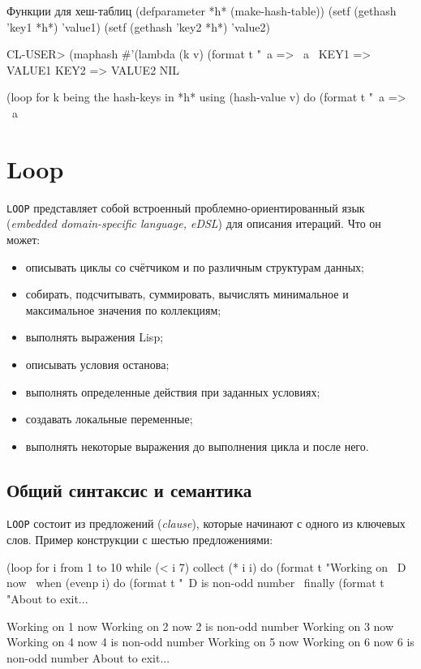 \begin{cllst}{Функции для хеш-таблиц}{}
(defparameter *h* (make-hash-table))
(setf (gethash 'key1 *h*) 'value1)
(setf (gethash 'key2 *h*) 'value2)

CL-USER> (maphash #'(lambda (k v) (format t "~a => ~a~%
KEY1 => VALUE1
KEY2 => VALUE2
NIL

(loop for k being the hash-keys in *h* using (hash-value v)
  do (format t "~a => ~a~%
\end{cllst}

\section{Loop}
\lstinline{LOOP} представляет собой встроенный проблемно-ориентированный язык (\emph{embedded domain-specific language, eDSL}) для описания итераций. Что он может:
\begin{itemize}
  \item описывать циклы со счётчиком и по различным структурам данных;
  \item собирать, подсчитывать, суммировать, вычислять минимальное и максимальное значения по коллекциям;
  \item выполнять выражения Lisp;
  \item описывать условия останова;
  \item выполнять определенные действия при заданных условиях;
  \item создавать локальные переменные;
  \item выполнять некоторые выражения до выполнения цикла и после него.
\end{itemize}

\subsection{Общий синтаксис и семантика}
\lstinline{LOOP} состоит из предложений (\emph{clause}), которые начинают с одного из ключевых слов. Пример конструкции с шестью предложениями:
\begin{cllst}{}{}
(loop for i from 1 to 10
   while (< i 7)
   collect (* i i)
   do (format t "Working on ~D now~%
   when (evenp i)
     do (format t "~D is non-odd number~%
   finally (format t "About to exit...~%
\end{cllst}
\begin{plainlst}{}{}
Working on 1 now
Working on 2 now
2 is non-odd number
Working on 3 now
Working on 4 now
4 is non-odd number
Working on 5 now
Working on 6 now
6 is non-odd number
About to exit...
\end{plainlst}

